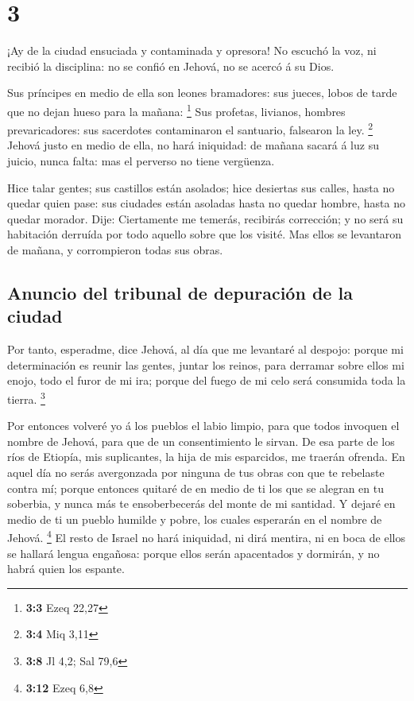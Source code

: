 \hypertarget{section-2}{%
\section{3}\label{section-2}}

 ¡Ay de la ciudad ensuciada y contaminada y opresora!
 No escuchó la voz, ni recibió la disciplina: no se confió
en Jehová, no se acercó á su Dios.

 Sus príncipes en medio de ella son leones bramadores: sus
jueces, lobos de tarde que no dejan hueso para la mañana: \footnote{\textbf{3:3}
  Ezeq 22,27}  Sus profetas, livianos, hombres
prevaricadores: sus sacerdotes contaminaron el santuario, falsearon la
ley. \footnote{\textbf{3:4} Miq 3,11}  Jehová justo en medio
de ella, no hará iniquidad: de mañana sacará á luz su juicio, nunca
falta: mas el perverso no tiene vergüenza.

 Hice talar gentes; sus castillos están asolados; hice
desiertas sus calles, hasta no quedar quien pase: sus ciudades están
asoladas hasta no quedar hombre, hasta no quedar morador. 
Dije: Ciertamente me temerás, recibirás corrección; y no será su
habitación derruída por todo aquello sobre que los visité. Mas ellos se
levantaron de mañana, y corrompieron todas sus obras.

\hypertarget{anuncio-del-tribunal-de-depuraciuxf3n-de-la-ciudad}{%
\subsection{Anuncio del tribunal de depuración de la
ciudad}\label{anuncio-del-tribunal-de-depuraciuxf3n-de-la-ciudad}}

 Por tanto, esperadme, dice Jehová, al día que me levantaré
al despojo: porque mi determinación es reunir las gentes, juntar los
reinos, para derramar sobre ellos mi enojo, todo el furor de mi ira;
porque del fuego de mi celo será consumida toda la tierra. \footnote{\textbf{3:8}
  Jl 4,2; Sal 79,6}

 Por entonces volveré yo á los pueblos el labio limpio, para
que todos invoquen el nombre de Jehová, para que de un consentimiento le
sirvan.  De esa parte de los ríos de Etiopía, mis
suplicantes, la hija de mis esparcidos, me traerán ofrenda.
 En aquel día no serás avergonzada por ninguna de tus obras
con que te rebelaste contra mí; porque entonces quitaré de en medio de
ti los que se alegran en tu soberbia, y nunca más te ensoberbecerás del
monte de mi santidad.  Y dejaré en medio de ti un pueblo
humilde y pobre, los cuales esperarán en el nombre de Jehová.
\footnote{\textbf{3:12} Ezeq 6,8}  El resto de Israel no
hará iniquidad, ni dirá mentira, ni en boca de ellos se hallará lengua
engañosa: porque ellos serán apacentados y dormirán, y no habrá quien
los espante.

